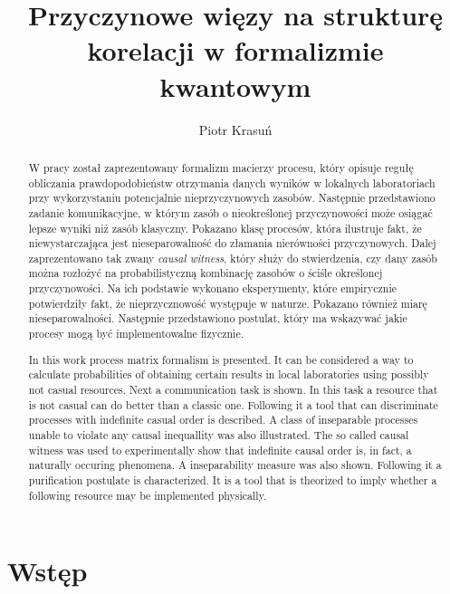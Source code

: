 \documentclass[10pt]{article} %
\title{Przyczynowe więzy na strukturę korelacji w formalizmie kwantowym}
\author{Piotr Krasuń}
\begin{document}
\maketitle

\newpage
\begin{abstract}
W pracy został zaprezentowany formalizm macierzy procesu, który opisuje regułę obliczania prawdopodobieństw otrzymania danych wyników w lokalnych laboratoriach przy wykorzystaniu potencjalnie nieprzyczynowych zasobów. Następnie przedstawiono zadanie komunikacyjne, w którym zasób o nieokreślonej przyczynowości może osiągać lepsze wyniki niż zasób klasyczny. Pokazano klasę procesów, która ilustruje fakt, że niewystarczająca jest nieseparowalność do złamania nierówności przyczynowych. Dalej zaprezentowano tak zwany \textit{causal witness}, który służy do stwierdzenia, czy dany zasób można rozłożyć na probabilistyczną kombinację zasobów o ściśle określonej przyczynowości. Na ich podstawie wykonano eksperymenty, które empirycznie potwierdziły fakt, że nieprzycznowość występuje w naturze. Pokazano również miarę nieseparowalności. Następnie przedstawiono postulat, który ma wskazywać jakie procesy mogą być implementowalne fizycznie.
\end{abstract}
\renewcommand{\abstractname}{Abstract}
\begin{abstract}
In this work process matrix formalism is presented. It can be considered a way to calculate probabilities of obtaining certain results in local laboratories using possibly not casual resources. Next a communication task is shown. In this task a resource that is not casual can do better than a classic one. Following it a tool that can discriminate processes with indefinite casual order is described. A class of inseparable processes unable to violate any causal inequallity was also illustrated. The so called causal witness was used to experimentally show that indefinite causal order is, in fact, a naturally occuring phenomena. A inseparability measure was also shown. Following it a purification postulate is characterized. It is a tool that is theorized to imply whether a following resource may be implemented physically.
\end{abstract}
\section{Wstęp}
\end{document}
